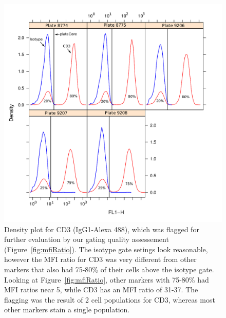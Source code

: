 \documentclass[12pt]{article}
\begin{document}
\begin{figure}
\centering
\includegraphics{mfiRatio2.pdf}
\caption{Density plot for CD3 (IgG1-Alexa 488), which was flagged for further
evaluation by our gating quality assessement (Figure~\ref{fig:mfiRatio}).
The isotype gate setings look reasonable, however the MFI ratio for CD3 was
very different from other markers that also had 75-80\% of their cells above
the isotype gate. Looking at Figure~\ref{fig:mfiRatio}, other markers with
75-80\% had MFI ratios near 5, while CD3 has an MFI ratio of 31-37. The
flagging was the result of 2 cell populations for CD3, whereas most other
markers stain a single population. }
\label{fig:mfiRatio3}
\end{figure}


\clearpage

 
\end{document}
